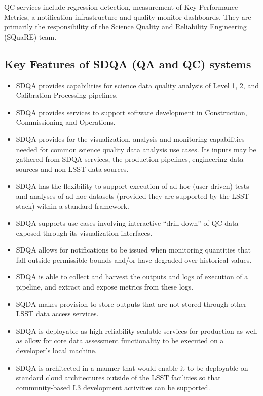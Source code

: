 QC services include regression detection, measurement of Key Performance Metrics, a notification infrastructure and quality monitor dashboards. They are primarily the responsibility of the Science Quality and Reliability Engineering (SQuaRE) team.

\subsection{Key Features of SDQA (QA and QC) systems}

\begin{itemize}
\item SDQA provides capabilities for science data quality analysis of Level 1, 2, and Calibration Processing pipelines.

\item SDQA provides services to support software development in Construction, Commissioning and Operations.

\item SDQA provides for the visualization, analysis and monitoring capabilities needed for common science quality data analysis use cases. Its inputs may be gathered from SDQA services, the production pipelines, engineering data sources and non-LSST data sources.

\item SDQA has the flexibility to support execution of ad-hoc (user-driven) tests and analyses of ad-hoc datasets (provided they are supported by the LSST stack) within a standard framework.

\item SDQA supports use cases involving interactive ``drill-down'' of QC data exposed through its visualization interfaces.

\item SDQA allows for notifications to be issued when monitoring quantities that fall outside permissible bounds and/or have degraded over historical values.

\item SDQA is able to collect and harvest the outputs and logs of execution of a pipeline, and extract and expose metrics from these logs.

\item SQDA makes provision to store outputs that are not stored through other LSST data access services.

\item SDQA is deployable as high-reliability scalable services for production as well as allow for core data assessment functionality to be executed on a developer's local machine.

\item SDQA is architected in a manner that would enable it to be deployable on standard cloud architectures outside of the LSST facilities so that community-based L3 development activities can be supported.

\end{itemize}

